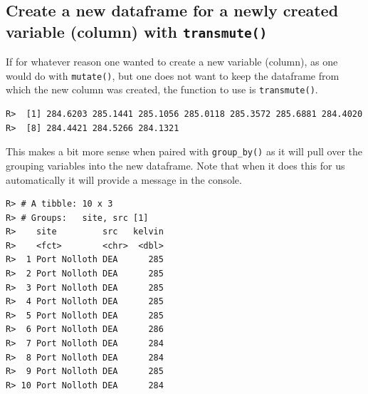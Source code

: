 \documentclass[]{book}
\newenvironment{Shaded}{\begin{snugshade}}{\end{snugshade}}
\newcommand{\KeywordTok}[1]{\textcolor[rgb]{0.13,0.29,0.53}{\textbf{#1}}}
\newcommand{\DataTypeTok}[1]{\textcolor[rgb]{0.13,0.29,0.53}{#1}}
\newcommand{\FloatTok}[1]{\textcolor[rgb]{0.00,0.00,0.81}{#1}}
\newcommand{\StringTok}[1]{\textcolor[rgb]{0.31,0.60,0.02}{#1}}
\newcommand{\OperatorTok}[1]{\textcolor[rgb]{0.81,0.36,0.00}{\textbf{#1}}}
\newcommand{\NormalTok}[1]{#1}
\theoremstyle{definition}
\theoremstyle{definition}
\theoremstyle{definition}
\theoremstyle{remark}
\begin{document}
\subsection{\texorpdfstring{Create a new dataframe for a newly created
variable (column) with
\texttt{transmute()}}{Create a new dataframe for a newly created variable (column) with transmute()}}\label{create-a-new-dataframe-for-a-newly-created-variable-column-with-transmute}

If for whatever reason one wanted to create a new variable (column), as
one would do with \texttt{mutate()}, but one does not want to keep the
dataframe from which the new column was created, the function to use is
\texttt{transmute()}.

\begin{Shaded}
\end{Shaded}

\begin{verbatim}
R>  [1] 284.6203 285.1441 285.1056 285.0118 285.3572 285.6881 284.4020
R>  [8] 284.4421 284.5266 284.1321
\end{verbatim}

This makes a bit more sense when paired with \texttt{group\_by()} as it
will pull over the grouping variables into the new dataframe. Note that
when it does this for us automatically it will provide a message in the
console.

\begin{Shaded}
\end{Shaded}

\begin{verbatim}
R> # A tibble: 10 x 3
R> # Groups:   site, src [1]
R>    site         src   kelvin
R>    <fct>        <chr>  <dbl>
R>  1 Port Nolloth DEA      285
R>  2 Port Nolloth DEA      285
R>  3 Port Nolloth DEA      285
R>  4 Port Nolloth DEA      285
R>  5 Port Nolloth DEA      285
R>  6 Port Nolloth DEA      286
R>  7 Port Nolloth DEA      284
R>  8 Port Nolloth DEA      284
R>  9 Port Nolloth DEA      285
R> 10 Port Nolloth DEA      284
\end{verbatim}
\end{document}
